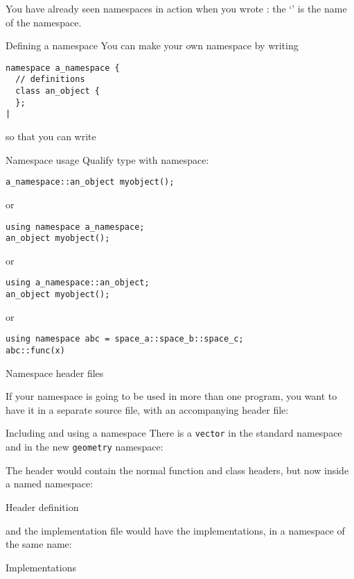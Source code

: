 You have already seen namespaces in action when you wrote
: the `' is the name of the namespace.

\begin{block}{Defining a namespace}
  \label{sl:namespace-def}
  You can make your own namespace by writing
\begin{lstlisting}
namespace a_namespace {
  // definitions
  class an_object { 
  };
|
\end{lstlisting}
\end{block}

so that you can write
\begin{block}{Namespace usage}
  \label{sl:namespace-use}
Qualify type with namespace:
\begin{lstlisting}
a_namespace::an_object myobject();
\end{lstlisting}
or
\begin{lstlisting}
using namespace a_namespace;
an_object myobject();
\end{lstlisting}
or
\begin{lstlisting}
using a_namespace::an_object;
an_object myobject();
\end{lstlisting}
or
\begin{lstlisting}
using namespace abc = space_a::space_b::space_c;
abc::func(x)
\end{lstlisting}
\end{block}

 {Namespace header files}

If your namespace is going to be used in more than one program, you
want to have it in a separate source file, with an accompanying header
file:
%
\begin{block}{Including and using a namespace}
  \label{sl:nameinclude}
  There is a \lstinline{vector} in the standard namespace
  and in the new \lstinline{geometry} namespace:
\end{block}

The header would contain the normal function and class headers, but
now inside a named namespace:
%
\begin{block}{Header definition}
  \label{sl:nameheader}
\end{block}

and the implementation file would have the implementations,
in a
namespace of the same name:
%
\begin{block}{Implementations}
  \label{sl:nameimpl}
\end{block}

